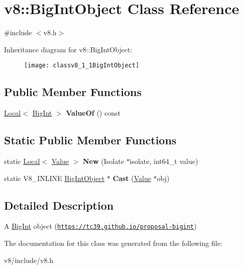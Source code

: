 \hypertarget{classv8_1_1BigIntObject}{}\section{v8\+:\+:Big\+Int\+Object Class Reference}
\label{classv8_1_1BigIntObject}


{\ttfamily \#include $<$v8.\+h$>$}

Inheritance diagram for v8\+:\+:Big\+Int\+Object\+:\begin{figure}[H]
\begin{center}
\leavevmode
\texttt{[image: classv8\_1\_1BigIntObject]}
\end{center}
\end{figure}
\subsection*{Public Member Functions}
\begin{DoxyCompactItemize}
\item 
\mbox{\label{classv8_1_1BigIntObject_a54afb6996195d90226b1b569ca3260e4}} 
\mbox{\hyperlink{classv8_1_1Local}{Local}}$<$ \mbox{\hyperlink{classv8_1_1BigInt}{Big\+Int}} $>$ {\bfseries Value\+Of} () const
\end{DoxyCompactItemize}
\subsection*{Static Public Member Functions}
\begin{DoxyCompactItemize}
\item 
\mbox{\label{classv8_1_1BigIntObject_aeadcd7f6344bad684c97f300715064ee}} 
static \mbox{\hyperlink{classv8_1_1Local}{Local}}$<$ \mbox{\hyperlink{classv8_1_1Value}{Value}} $>$ {\bfseries New} (Isolate $\ast$isolate, int64\+\_\+t value)
\item 
\mbox{\label{classv8_1_1BigIntObject_a0d860e8c61719574ae4517248f4ee667}} 
static V8\+\_\+\+I\+N\+L\+I\+NE \mbox{\hyperlink{classv8_1_1BigIntObject}{Big\+Int\+Object}} $\ast$ {\bfseries Cast} (\mbox{\hyperlink{classv8_1_1Value}{Value}} $\ast$obj)
\end{DoxyCompactItemize}


\subsection{Detailed Description}
A \mbox{\hyperlink{classv8_1_1BigInt}{Big\+Int}} object (\href{https://tc39.github.io/proposal-bigint}{\tt https\+://tc39.\+github.\+io/proposal-\/bigint}) 

The documentation for this class was generated from the following file\+:\begin{DoxyCompactItemize}
\item 
v8/include/v8.\+h\end{DoxyCompactItemize}
